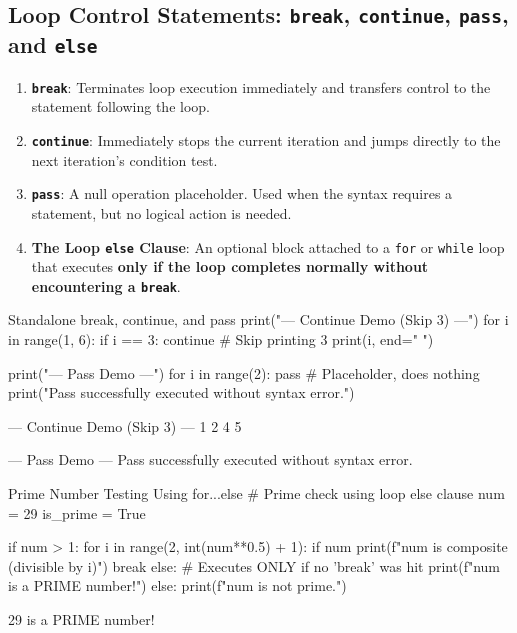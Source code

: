 \subsection{Loop Control Statements: \texttt{break}, \texttt{continue}, \texttt{pass}, and \texttt{else}}

\begin{enumerate}[leftmargin=1.5em]
    \item \textbf{\texttt{break}}: Terminates loop execution immediately and transfers control to the statement following the loop.
    \item \textbf{\texttt{continue}}: Immediately stops the current iteration and jumps directly to the next iteration's condition test.
    \item \textbf{\texttt{pass}}: A null operation placeholder. Used when the syntax requires a statement, but no logical action is needed.
    \item \textbf{The Loop \texttt{else} Clause}: An optional block attached to a \texttt{for} or \texttt{while} loop that executes \textbf{only if the loop completes normally without encountering a \texttt{break}}.
\end{enumerate}

\begin{pythoncode}{Standalone break, continue, and pass}
print("--- Continue Demo (Skip 3) ---")
for i in range(1, 6):
    if i == 3:
        continue  # Skip printing 3
    print(i, end=" ")

print("\n\n--- Pass Demo ---")
for i in range(2):
    pass  # Placeholder, does nothing
print("Pass successfully executed without syntax error.")
\end{pythoncode}
\begin{outputbox}
--- Continue Demo (Skip 3) ---
1 2 4 5 

--- Pass Demo ---
Pass successfully executed without syntax error.
\end{outputbox}

\begin{pythoncode}{Prime Number Testing Using for...else}
# Prime check using loop else clause
num = 29
is_prime = True

if num > 1:
    for i in range(2, int(num**0.5) + 1):
        if num %
            print(f"{num} is composite (divisible by {i})")
            break
    else:
        # Executes ONLY if no 'break' was hit
        print(f"{num} is a PRIME number!")
else:
    print(f"{num} is not prime.")
\end{pythoncode}
\begin{outputbox}
29 is a PRIME number!
\end{outputbox}


